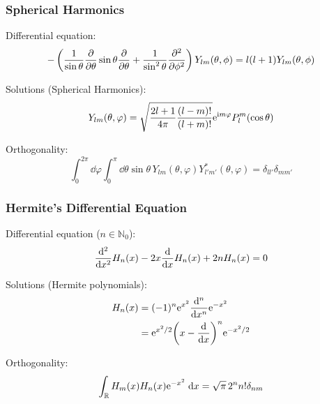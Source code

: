		\subsubsection{Spherical Harmonics}
			\noindent
			Differential equation:
			\begin{equation}
				-\left(
				\frac{1}{\sin\theta}\pdv{\theta}\sin\theta\pdv{\theta} + \frac{1}{\sin^2\theta}\frac{\partial^2}{\partial \phi^2}
				\right)
				Y_{lm}(\theta,\phi) = l(l+1)Y_{lm}(\theta,\phi)
			\end{equation}

			\noindent
			Solutions (Spherical Harmonics):
			\begin{equation} \label{Eq:SphericalHarmonics}
				Y_{lm}(\theta,\varphi) = \sqrt{\frac{2l+1}{4\pi}\frac{(l-m)!}{(l+m)!}} \mathrm{e}^{\mathrm{i} m\varphi} P_l^m(\cos\theta)
			\end{equation}

			\noindent
			Orthogonality:
			\begin{equation}
				\int_0^{2\pi}\dd\varphi \int_0^{\pi}\dd\theta \sin\theta\, Y_{lm}(\theta,\varphi) Y^{*}_{l'm'}(\theta,\varphi) = 	\delta_{ll'}\delta_{mm'}
			\end{equation}

		\subsubsection{Hermite's Differential Equation}
			\noindent
			Differential equation ($n\in\mathbb{N}_0$):
			\begin{equation}
				\dv[2]{x} H_n(x) -2x\dv{x} H_n(x) +2 n H_n(x)=0
			\end{equation}

			\noindent
			Solutions (Hermite polynomials):
			\begin{equation} \label{Eq:HermitePolynomials}
				\begin{aligned}
					H_n(x) &= (-1)^n \mathrm{e}^{x^2} \dv[n]{x} \mathrm{e}^{-x^2} \\
					&= \mathrm{e}^{x^2/2}\qty(x-\dv{x})^n \mathrm{e}^{-x^2/2} \\
				\end{aligned}
			\end{equation}

			\noindent
			Orthogonality:
			\begin{equation}
				\int_{\mathbb{R}} H_m(x) H_n(x) \mathrm{e}^{-x^2}\;\dd x = \sqrt{\pi}\,2^n n!\delta_{nm}
			\end{equation}

